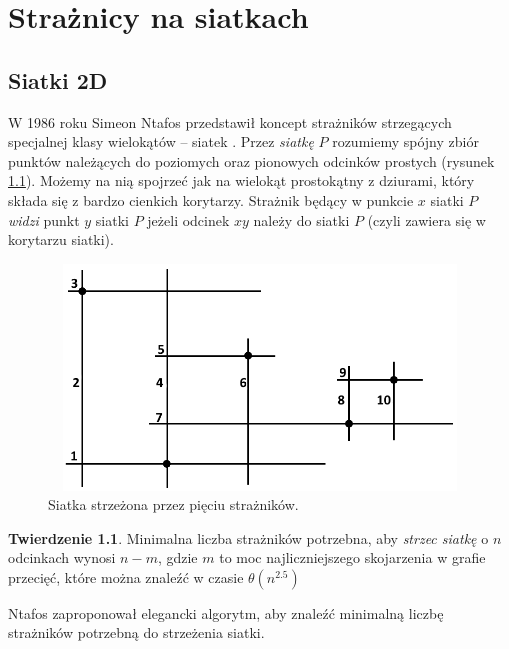 \documentclass[brudnopis]{xmgr}
\theoremstyle{definition}
\newtheorem{Twierdzenie}{Twierdzenie}
\begin{document}
\chapter{Strażnicy na siatkach}
\section{Siatki 2D}
W 1986 roku Simeon Ntafos przedstawił koncept strażników strzegących specjalnej klasy wielokątów -- siatek \cite{ntafos}.
Przez \emph{siatkę} $P$ rozumiemy spójny zbiór punktów należących do poziomych oraz pionowych odcinków prostych (rysunek \ref{fig:siatka 2d}). Możemy na nią spojrzeć jak na wielokąt prostokątny z dziurami, który składa się z bardzo cienkich korytarzy.
Strażnik będący w punkcie $x$ siatki $P$ \emph{widzi} punkt $y$ siatki $P$ jeżeli odcinek $xy$ należy do siatki $P$ (czyli zawiera się w korytarzu siatki).
 \begin{figure}[ht!]
   \centering
   \includegraphics[width=14cm,height=6cm]{rysunki/przykladowa_siatka.png}
   \caption{Siatka strzeżona przez pięciu strażników.}
   \label{fig:siatka 2d}
 \end{figure} 

\begin{Twierdzenie}\cite{ntafos}
	Minimalna liczba strażników potrzebna, aby \emph{strzec siatkę} o $n$ odcinkach wynosi $n - m$, gdzie $m$ to moc najliczniejszego skojarzenia w grafie przecięć, które można znaleźć w czasie $\theta(n^{2.5})$
\end{Twierdzenie}

Ntafos zaproponował elegancki algorytm, aby znaleźć minimalną liczbę strażników potrzebną do strzeżenia siatki.
\end{document}
